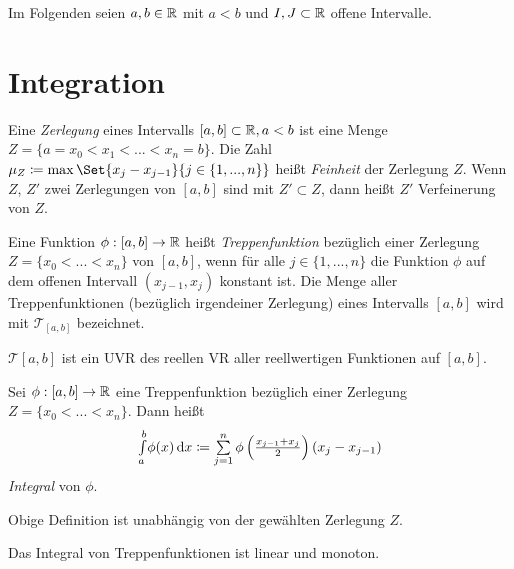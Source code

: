 \documentclass{cheat-sheet}
\begin{document}

\begin{nota}
Im Folgenden seien $a, b \in \mathbb{R}$ mit $a < b$ und $I, J \subset \mathbb{R}$ offene Intervalle.
\end{nota}

\section{Integration}

\begin{defn}
Eine \emph{Zerlegung} eines Intervalls $[a, b] \subset \mathbb{R}, a < b$ ist eine Menge $Z = \{ a = x_{0} < x_{1} < ... < x_{n} = b \}$. Die Zahl $\mu_{Z} \coloneqq \max\Set{x_{j} - x_{j-1}}{j \in \{1, ..., n\}}$ heißt \emph{Feinheit} der Zerlegung $Z$. Wenn $Z$, $Z'$ zwei Zerlegungen von $[a, b]$ sind mit $Z' \subset Z$, dann heißt $Z'$ Verfeinerung von $Z$.
\end{defn}

\begin{defn}
Eine Funktion $\phi : [a, b] \to \mathbb{R}$ heißt \emph{Treppenfunktion} bezüglich einer Zerlegung $Z = \{ x_{0} < ... < x_{n} \}$ von $[a, b]$, wenn für alle $j \in \{ 1, ..., n \}$ die Funktion $\phi$ auf dem offenen Intervall $(x_{j-1}, x_{j})$ konstant ist. Die Menge aller Treppenfunktionen (bezüglich irgendeiner Zerlegung) eines Intervalls $[a, b]$ wird mit $\mathcal{T}_{[a, b]}$ bezeichnet.
\end{defn}

\begin{satz}
$\mathcal{T}{[a, b]}$ ist ein UVR des reellen VR aller reellwertigen Funktionen auf $[a, b]$.
\end{satz}

\begin{defn}
Sei $\phi : [a, b] \to \mathbb{R}$ eine Treppenfunktion bezüglich einer Zerlegung $Z = \{ x_0 < ... < x_n \}$. Dann heißt
\[ \Intabdx{\phi(x)} \coloneqq \sum_{j = 1}^{n} \phi\left(\tfrac{x_{j-1} + x_j}{2}\right)(x_j - x_{j-1}) \]
\emph{Integral} von $\phi$.
\end{defn}

\begin{bem}
Obige Definition ist unabhängig von der gewählten Zerlegung $Z$.
\end{bem}

\begin{satz}
Das Integral von Treppenfunktionen ist linear und monoton.
\end{satz}
\end{document}

